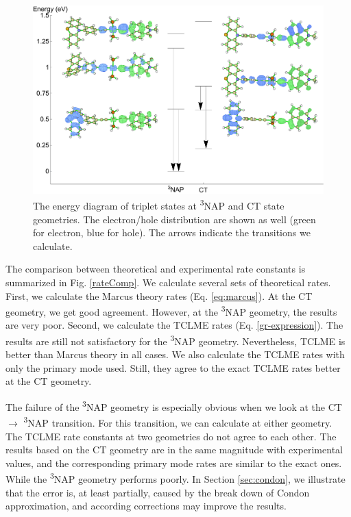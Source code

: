 \begin{figure}[!t]
\includegraphics[width=\columnwidth]{Chapters/chap4/Images/energy_diagram.pdf}
\caption{The energy diagram of triplet states at \textsuperscript{3}NAP and CT state geometries. The electron/hole distribution are shown as well (green for electron, blue for hole). The arrows indicate the transitions we calculate.
}\label{ene_diagram}
\end{figure}


The comparison between theoretical and experimental rate constants is summarized in Fig. \ref{rateComp}. We calculate several sets of theoretical rates. First, we calculate the Marcus theory rates (Eq. \ref{eq:marcus}). At the CT geometry, we get good agreement. However, at the \textsuperscript{3}NAP geometry, the results are very poor. Second, we calculate the TCLME rates (Eq. \ref{gr-expression}). The results are still not satisfactory for the \textsuperscript{3}NAP geometry. Nevertheless, TCLME is better than Marcus theory in all cases. We also calculate the TCLME rates with only the primary mode used. Still, they agree to the exact TCLME rates better at the CT geometry.

The failure of the \textsuperscript{3}NAP geometry is especially obvious when we look at the CT $\rightarrow$ \textsuperscript{3}NAP transition. For this transition, we can calculate at either geometry. The TCLME rate constants at two geometries do not agree to each other. The results based on the CT geometry are in the same magnitude with experimental values, and the corresponding primary mode rates are similar to the exact ones. While the \textsuperscript{3}NAP geometry performs poorly. In Section \ref{sec:condon}, we illustrate that the error is, at least partially, caused by the break down of Condon approximation, and according corrections may improve the results.

